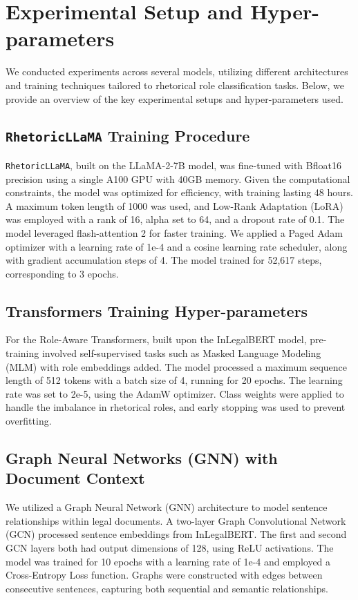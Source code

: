 \newpage
\section{Experimental Setup and Hyper-parameters}
We conducted experiments across several models, utilizing different architectures and training techniques tailored to rhetorical role classification tasks. Below, we provide an overview of the key experimental setups and hyper-parameters used.

\subsection{\texttt{RhetoricLLaMA} Training Procedure}
\texttt{RhetoricLLaMA}, built on the LLaMA-2-7B model, was fine-tuned with Bfloat16 precision using a single A100 GPU with 40GB memory. Given the computational constraints, the model was optimized for efficiency, with training lasting 48 hours. A maximum token length of 1000 was used, and Low-Rank Adaptation (LoRA) was employed with a rank of 16, alpha set to 64, and a dropout rate of 0.1. The model leveraged flash-attention 2 for faster training. We applied a Paged Adam optimizer with a learning rate of 1e-4 and a cosine learning rate scheduler, along with gradient accumulation steps of 4. The model trained for 52,617 steps, corresponding to 3 epochs.

\subsection{Transformers Training Hyper-parameters}
For the Role-Aware Transformers, built upon the InLegalBERT model, pre-training involved self-supervised tasks such as Masked Language Modeling (MLM) with role embeddings added. The model processed a maximum sequence length of 512 tokens with a batch size of 4, running for 20 epochs. The learning rate was set to 2e-5, using the AdamW optimizer. Class weights were applied to handle the imbalance in rhetorical roles, and early stopping was used to prevent overfitting.

\subsection{Graph Neural Networks (GNN) with Document Context}
We utilized a Graph Neural Network (GNN) architecture to model sentence relationships within legal documents. A two-layer Graph Convolutional Network (GCN) processed sentence embeddings from InLegalBERT. The first and second GCN layers both had output dimensions of 128, using ReLU activations. The model was trained for 10 epochs with a learning rate of 1e-4 and employed a Cross-Entropy Loss function. Graphs were constructed with edges between consecutive sentences, capturing both sequential and semantic relationships.


